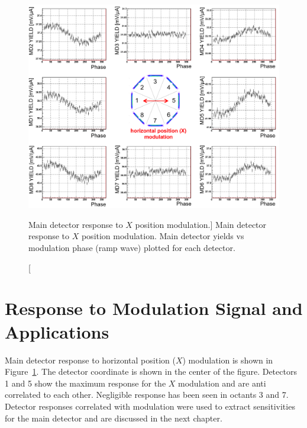 \begin{singlespace}
\begin{figure}[!h]
	\begin{center}
	\includegraphics[width=15.0cm]{figures/BModDetectorResponse}
	\end{center}
	\caption
	[Main detector response to $X$ position modulation.]
	{Main detector response to $X$ position modulation. Main detector yields vs modulation phase (ramp wave) plotted for each detector. }
	\label{fig:BModDetectorResponse}
\end{figure}
\end{singlespace}

\section{Response to Modulation Signal and Applications}
\label{Response to Modulation Signal and Applications}
Main detector response to horizontal position ($X$) modulation is shown in Figure~\ref{fig:BModDetectorResponse}. The detector coordinate is shown in the center of the figure. Detectors 1 and 5 show the maximum response for the $X$ modulation and are anti correlated to each other. Negligible response has been seen in octants 3 and 7. Detector responses correlated with modulation were used to extract sensitivities for the main detector and are discussed in the next chapter. 

